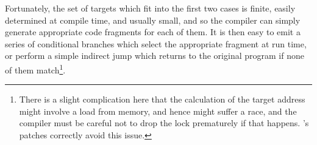 Fortunately, the set of targets which fit into the first two cases is
finite, easily determined at compile time, and usually small, and so
the compiler can simply generate appropriate code fragments for each
of them.  It is then easy to emit a series of conditional branches
which select the appropriate fragment at run time, or perform a simple
indirect jump which returns to the original program if none of them
match\footnote{There is a slight complication here that the
  calculation of the target address might involve a load from memory,
  and hence might suffer a race, and the compiler must be careful not
  to drop the lock prematurely if that happens.  {\Implementation}'s
  patches correctly avoid this issue.}.

